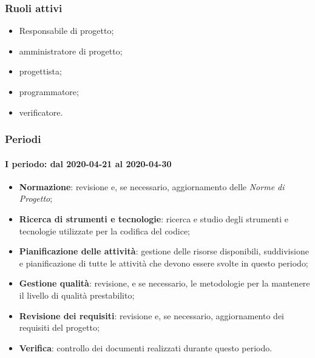\subsubsection{Ruoli attivi}
\begin{itemize}
	\item Responsabile di progetto\glo;
	\item amministratore di progetto\glo;
	\item progettista;
	\item programmatore;
	\item verificatore.
\end{itemize}

\subsubsection{Periodi}
\paragraph*{I periodo: dal 2020-04-21 al 2020-04-30}
\begin{itemize}
	\item \textbf{Normazione}: revisione e, se necessario, aggiornamento delle \textit{Norme di Progetto};
	\item \textbf{Ricerca di strumenti e tecnologie}: ricerca e studio degli strumenti e tecnologie utilizzate per la codifica del codice;
	\item \textbf{Pianificazione delle attività}: gestione delle risorse disponibili, suddivisione e pianificazione di tutte le attività che devono essere svolte in questo periodo;
	\item \textbf{Gestione qualità}: revisione, e se necessario, le metodologie per la mantenere il livello di qualità prestabilito;
	\item \textbf{Revisione dei requisiti}: revisione e, se necessario, aggiornamento dei requisiti del progetto\glo;
	\item \textbf{Verifica}: controllo dei documenti realizzati durante questo periodo.
\end{itemize}

